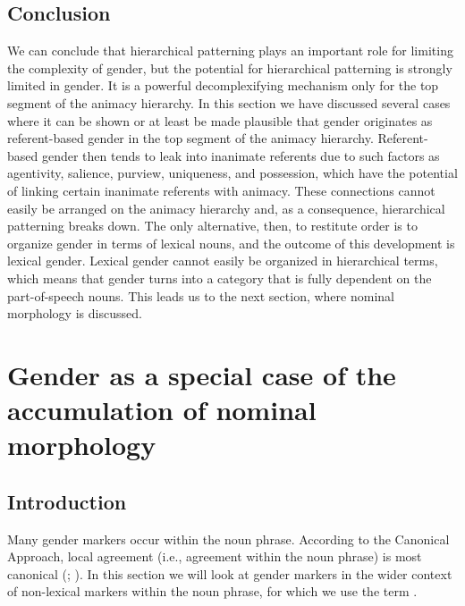 \documentclass[output=collectionpaper]{langsci/langscibook}
\begin{document}
  \subsection{Conclusion}

We can conclude that hierarchical patterning plays an important role for limiting the complexity of gender, but the potential for hierarchical patterning is strongly limited in gender. It is a powerful decomplexifying mechanism only for the top segment of the animacy hierarchy. In this section we have discussed several cases where it can be shown or at least be made plausible that gender originates as referent-based gender in the top segment of the animacy hierarchy. Referent-based gender then tends to leak into inanimate referents due to such factors as agentivity, salience, purview, uniqueness, and possession, which have the potential of linking certain inanimate referents with animacy. These connections cannot easily be arranged on the animacy hierarchy and, as a consequence, hierarchical patterning breaks down. The only alternative, then, to restitute order is to organize gender in terms of lexical nouns, and the outcome of this development is lexical gender. Lexical gender cannot easily be organized in hierarchical terms, which means that gender turns into a category that is fully dependent on the part-of-speech nouns. This leads us to the next section, where nominal morphology is discussed.

\section{Gender as a special case of the accumulation of nominal morphology}
\label{sec:WDG:4}

\subsection{Introduction}
\label{sec:WDG:4.1}

Many gender markers occur within the noun phrase. According to the Canonical Approach, local agreement (i.e., agreement within the noun phrase) is most canonical (\citealt[21]{Corbett2006}; ). In this section we will look at gender markers in the wider context of non-lexical markers within the noun phrase, for which we use the term .
\end{document}
